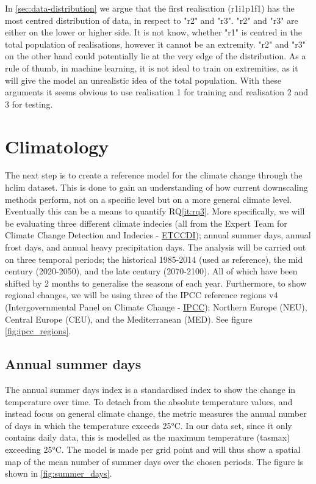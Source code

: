  In \autoref{sec:data-distribution} we argue that the first \gls{realisation} (r1i1p1f1) has the most centred distribution of data, in respect to "r2" and "r3". "r2" and "r3" are either on the lower or higher side. It is not know, whether "r1" is centred in the total population of \glspl{realisation}, however it cannot be an extremity. "r2" and "r3" on the other hand could potentially lie at the very edge of the distribution. As a rule of thumb, in machine learning, it is not ideal to train on extremities, as it will give the model an unrealistic idea of the total population. With these arguments it seems obvious to use \gls{realisation} 1 for training and \gls{realisation} 2 and 3 for testing.

 \section{Climatology}

The next step is to create a reference model for the climate change through the \gls{hclim} dataset. This is done to gain an understanding of how current downscaling methods perform, not on a specific level but on a more general climate level. Eventually this can be a means to quantify RQ\ref{it:rq3}. More specifically, we will be evaluating three different climate indecies (all from the Expert Team for Climate Change Detection and Indecies - \href{https://etccdi.pacificclimate.org/list_27_indices.shtml}{ETCCDI}); annual summer days, annual frost days, and annual heavy precipitation days. The analysis will be carried out on three temporal periods; the historical 1985-2014 (used as reference), the mid century (2020-2050), and the late century (2070-2100). All of which have been shifted by 2 months to generalise the seasons of each year. 
Furthermore, to show regional changes, we will be using three of the IPCC reference regions v4 (Intergovernmental Panel on Climate Change - \href{https://interactive-atlas.ipcc.ch/regional-information}{IPCC}); Northern Europe (NEU), Central Europe (CEU), and the Mediterranean (MED). See figure \autoref{fig:ipcc_regions}.

\subsection{Annual summer days}

The annual summer days index is a standardised index to show the change in temperature over time. To detach from the absolute temperature values, and instead focus on general climate change, the metric measures the annual number of days in which the temperature exceeds 25°C. In our data set, since it only contains daily data, this is modelled as the maximum temperature (tasmax) exceeding 25°C. The model is made per grid point and will thus show a spatial map of the mean number of summer days over the chosen periods. The figure is shown in \autoref{fig:summer_days}.

